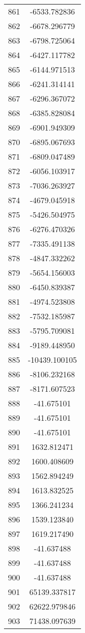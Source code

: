 \documentclass[12pt]{article}
\begin{document}
\begin{longtable}{@{}cc@{}}
861 & -6533.782836 \\
862 & -6678.296779 \\
863 & -6798.725064 \\
864 & -6427.117782 \\
865 & -6144.971513 \\
866 & -6241.314141 \\
867 & -6296.367072 \\
868 & -6385.828084 \\
869 & -6901.949309 \\
870 & -6895.067693 \\
871 & -6809.047489 \\
872 & -6056.103917 \\
873 & -7036.263927 \\
874 & -4679.045918 \\
875 & -5426.504975 \\
876 & -6276.470326 \\
877 & -7335.491138 \\
878 & -4847.332262 \\
879 & -5654.156003 \\
880 & -6450.839387 \\
881 & -4974.523808 \\
882 & -7532.185987 \\
883 & -5795.709081 \\
884 & -9189.448950 \\
885 & -10439.100105 \\
886 & -8106.232168 \\
887 & -8171.607523 \\
888 & -41.675101 \\
889 & -41.675101 \\
890 & -41.675101 \\
891 & 1632.812471 \\
892 & 1600.408609 \\
893 & 1562.894249 \\
894 & 1613.832525 \\
895 & 1366.241234 \\
896 & 1539.123840 \\
897 & 1619.217490 \\
898 & -41.637488 \\
899 & -41.637488 \\
900 & -41.637488 \\
901 & 65139.337817 \\
902 & 62622.979846 \\
903 & 71438.097639 \\

\end{longtable}
\end{document}
